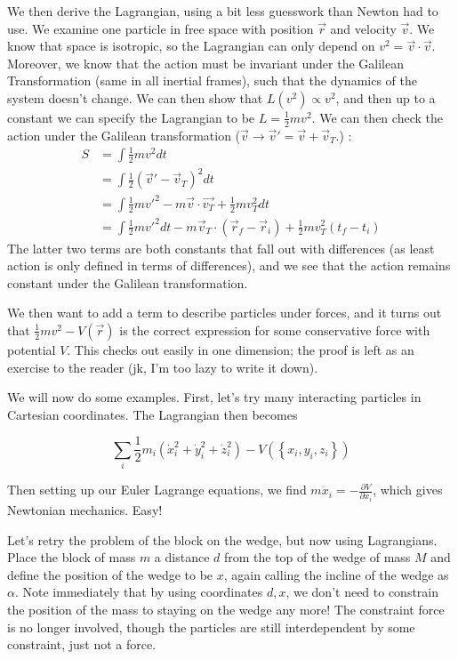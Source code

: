 \documentclass[10pt]{report}
\newcommand{\pd}[2]{\frac{\partial #1}{\partial#2}}
\begin{document}
We then derive the Lagrangian, using a bit less guesswork than Newton had to use. We examine one particle in free space with position $\vec{r}$ and velocity $\vec{v}$. We know that space is isotropic, so the Lagrangian can only depend on $v^2 = \vec{v}\cdot\vec{v}$. Moreover, we know that the action must be invariant under the Galilean Transformation (same in all inertial frames), such that the dynamics of the system doesn't change. We can then show that $L(v^2) \propto v^2$, and then up to a constant we can specify the Lagrangian to be $L = \frac{1}{2}mv^2$. We can then check the action under the Galilean transformation ($\vec{v} \to \vec{v}' = \vec{v} + \vec{v}_T$.) :
\begin{align*}
    S &= \int \frac{1}{2}mv^2 dt\\
    &= \int\frac{1}{2}(\vec{v}'-\vec{v}_T)^2 dt\\
    &= \int\frac{1}{2}mv'^2 -m\vec{v}\cdot\vec{v_T} + \frac{1}{2}mv_T^2 dt\\
    &= \int \frac{1}{2}mv'^2 dt - m\vec{v}_T\cdot(\vec{r}_f - \vec{r}_i) + \frac{1}{2}mv_T^2(t_f - t_i)
\end{align*}
The latter two terms are both constants that fall out with differences (as least action is only defined in terms of differences), and we see that the action remains constant under the Galilean transformation.

We then want to add a term to describe particles under forces, and it turns out that $\frac{1}{2}mv^2 - V(\vec{r})$ is the correct expression for some conservative force with potential $V$. This checks out easily in one dimension; the proof is left as an exercise to the reader (jk, I'm too lazy to write it down). 

We will now do some examples. First, let's try many interacting particles in Cartesian coordinates. The Lagrangian then becomes

$$\sum_i \frac{1}{2}m_i\left( \dot{x}_i^2 + \dot{y}_i^2 + \dot{z}_i^2 \right)-V(\left\{ x_i,y_i,z_i \right\})$$

Then setting up our Euler Lagrange equations, we find $m\ddot{x}_i=-\pd{V}{x_i}$, which gives Newtonian mechanics. Easy! 

Let's retry the problem of the block on the wedge, but now using Lagrangians. Place the block of mass $m$ a distance $d$ from the top of the wedge of mass $M$ and define the position of the wedge to be $x$, again calling the incline of the wedge as $\alpha$. Note immediately that by using coordinates $d,x$, we don't need to constrain the position of the mass to staying on the wedge any more! The constraint force is no longer involved, though the particles are still interdependent by some constraint, just not a force.
\end{document}
